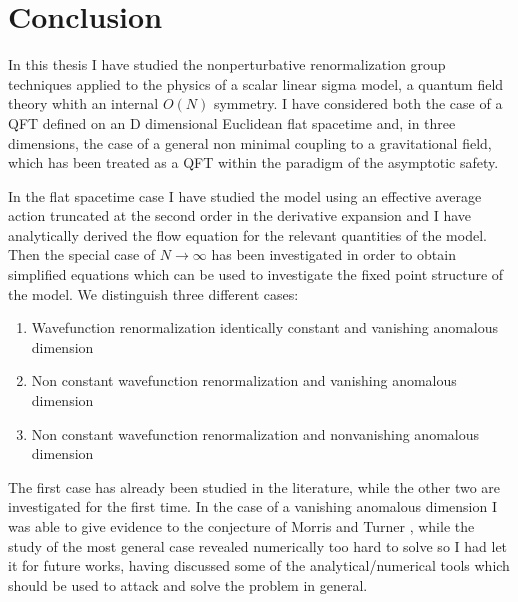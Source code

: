 \chapter*{Conclusion}
\noindent

In this thesis I have studied the nonperturbative renormalization group techniques applied to the physics of a scalar linear sigma model,
a quantum field theory whith an internal $O(N)$ symmetry. 
I have considered both the case of a QFT defined on an D dimensional Euclidean flat spacetime and, in three dimensions,
the case of a general non minimal coupling to a gravitational field, which has been treated as a QFT within 
the paradigm of the asymptotic safety.

In the flat spacetime case I have studied the model using an effective average action truncated at the second order in the derivative expansion and I have analytically  derived the flow equation for the relevant quantities 
of the model. Then the special case of $N\to \infty$ has been investigated in order to obtain simplified equations which can be used to investigate the fixed point structure of the model. We distinguish three different cases: 
\begin{enumerate}
 \item Wavefunction renormalization identically constant and vanishing anomalous dimension
 \item Non constant wavefunction renormalization and vanishing anomalous dimension
 \item Non constant wavefunction renormalization and nonvanishing anomalous dimension
\end{enumerate}
The first case has already been studied in the literature, while the other two are investigated for the first time. 
In the case of a vanishing anomalous dimension I was able to give evidence to the conjecture of Morris and Turner \cite{morristurner}, while the study of the most
general case revealed numerically too hard to solve so I had let it for future works, having discussed some of the analytical/numerical tools which should be used to attack and solve the problem in general.

